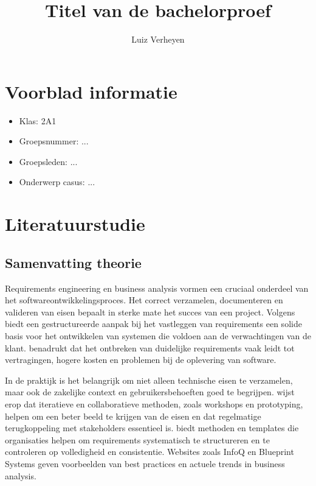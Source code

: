 \documentclass[dutch,dit,thesis]{hogentreport}
\author{Luiz Verheyen}
\title[Optionele ondertitel]{Titel van de bachelorproef}
\begin{document}
\frontmatter
\maketitle

\tableofcontents

\mainmatter{}

\chapter*{Voorblad informatie}
\begin{itemize}
    \item Klas: 2A1
    \item Groepsnummer: ...
    \item Groepsleden: ...
    \item Onderwerp casus: ...
\end{itemize}

\chapter{Literatuurstudie}

\section*{Samenvatting theorie}

Requirements engineering en business analysis vormen een cruciaal onderdeel van het softwareontwikkelingsproces. Het correct verzamelen, documenteren en valideren van eisen bepaalt in sterke mate het succes van een project. Volgens \parencite{robertson2012} biedt een gestructureerde aanpak bij het vastleggen van requirements een solide basis voor het ontwikkelen van systemen die voldoen aan de verwachtingen van de klant. \parencite{sommerville2016} benadrukt dat het ontbreken van duidelijke requirements vaak leidt tot vertragingen, hogere kosten en problemen bij de oplevering van software.

In de praktijk is het belangrijk om niet alleen technische eisen te verzamelen, maar ook de zakelijke context en gebruikersbehoeften goed te begrijpen. \parencite{ireb2025} wijst erop dat iteratieve en collaboratieve methoden, zoals workshops en prototyping, helpen om een beter beeld te krijgen van de eisen en dat regelmatige terugkoppeling met stakeholders essentieel is. \parencite{volere2025} biedt methoden en templates die organisaties helpen om requirements systematisch te structureren en te controleren op volledigheid en consistentie. Websites zoals InfoQ \parencite{infoq2025} en Blueprint Systems \parencite{blueprint2025} geven voorbeelden van best practices en actuele trends in business analysis.
\end{document}
